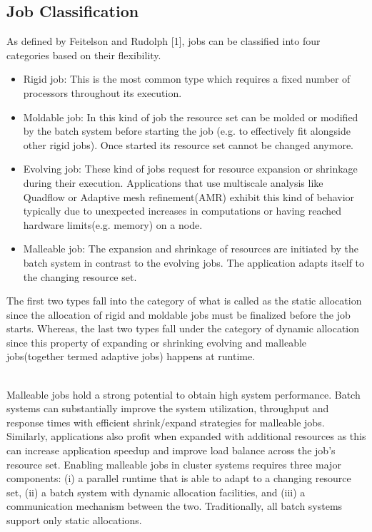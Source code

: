 \documentclass[a4paper, 12pt]{article}
\begin{document}
\subsection{Job Classification}
As defined by Feitelson and Rudolph [1], jobs can be classified into four categories based on their flexibility.
\begin{itemize}
\item Rigid job: This is the most common type which requires a fixed number of processors throughout its execution.
\item Moldable job: In this kind of job the resource set can be molded or modified by the batch system before starting the job (e.g. to effectively fit alongside other rigid jobs). Once started its resource set cannot be changed anymore.
\item Evolving job: These kind of jobs request for resource expansion or shrinkage during their execution. Applications that use multiscale analysis like Quadflow or Adaptive mesh refinement(AMR) exhibit this kind of behavior typically due to unexpected increases in computations or having reached hardware limits(e.g. memory) on a node. 
\item Malleable job: The expansion and shrinkage of resources are initiated by the batch system in contrast to the evolving jobs. The application adapts itself to the changing resource set.
\end{itemize}
The first two types fall into the category of what is called as the static allocation since the allocation of rigid and moldable jobs must be finalized before the job starts. Whereas, the last two types fall under the category of dynamic allocation since this property of expanding or shrinking evolving and malleable jobs(together termed adaptive jobs) happens at runtime.\par
\noindent
\\
Malleable jobs hold a strong potential to obtain high system performance. Batch systems can substantially improve the system utilization, throughput and response times with efficient shrink/expand strategies for malleable jobs. Similarly, applications also profit when expanded with additional resources as this can increase application speedup and improve load balance across the job’s resource set. Enabling malleable jobs in cluster systems requires three major components: (i) a parallel runtime that is able to adapt to a changing resource set, (ii) a batch system with dynamic allocation facilities, and (iii) a communication mechanism between the two. Traditionally, all batch systems support only static allocations.\par
\end{document}
